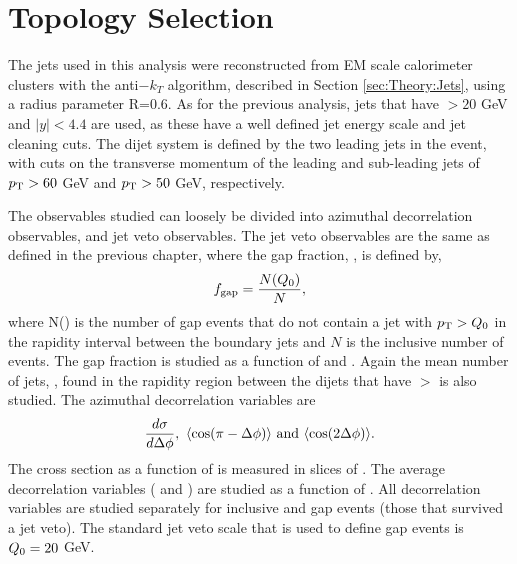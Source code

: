 \section{Topology Selection}
\label{sec:GBJ2:AnalSel}
The jets used in this analysis were reconstructed from EM scale calorimeter clusters with the anti$-k_T$ algorithm, described in Section \ref{sec:Theory:Jets}, using a radius parameter R=0.6.
As for the previous analysis, jets that have \pt{}$>20$ GeV and $|y|<4.4$ are used, as these have a well defined jet energy scale and jet cleaning cuts.
The dijet system is defined by the two leading jets in the event, with cuts on the transverse momentum of the leading and sub-leading jets of $\mbox{$p_{\rm T}$}{}>60$ GeV and $\mbox{$p_{\rm T}$}{}>50$ GeV, respectively.



The observables studied can loosely be divided into azimuthal decorrelation observables, and jet veto observables.
The jet veto observables are the same as defined in the previous chapter, where the gap fraction, \gap{}, is defined by,
\begin{equation}
f_{\rm gap} = \frac{N (\mbox{$Q_0$}{})}{N},
\label{GBJ2:fgap}
\end{equation}
where N(\qz{}) is the number of gap events that do not contain a jet with $\mbox{$p_{\rm T}$}{}>\mbox{$Q_0$}{}$ in the rapidity interval between the boundary jets and $N$ is the inclusive number of events.
The gap fraction is studied as a function of \dy{} and \qz{}.
Again the mean number of jets, \nb{}, found in the rapidity region between the dijets that have \pt{}$>$\qz{} is also studied. 
The azimuthal decorrelation variables are
\begin{equation}
\frac{d\sigma}{d\Delta\phi},~\mbox{$\langle \mbox{$\rm cos(\pi - \mbox{$\Delta{\rm \phi}$}{})$} \rangle$}~\rm{and}~\mbox{$\langle \mbox{$\rm cos(2\mbox{$\Delta{\rm \phi}$}{}) $} \rangle$}.
\label{GBJ2:AZVar}
\end{equation}
The cross section as a function of \dphi{} is measured in slices of \dy{}.
The average decorrelation variables (\mean{\cosdphi} and \mean{\costwodphi})  are studied as a function of \dy{}.
All decorrelation variables are studied separately for inclusive and gap events (those that survived a jet veto).
The standard jet veto scale that is used to define gap events is $\mbox{$Q_0$}{}=20$ GeV.


